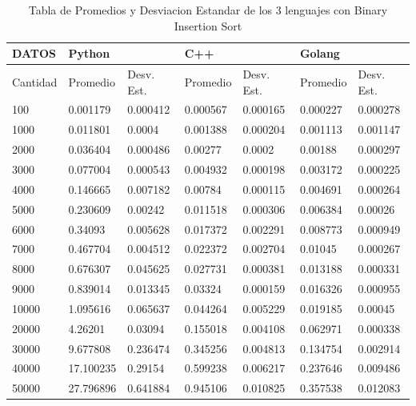 \documentclass[12pt]{article} %
\begin{document}
\begin{table}[H]
    \def\arraystretch{1.3}
    \centering
    \begin{tabular}{|l|l|l|l|l|l|l|}
    \hline        
        DATOS & Python & ~ & C++ & ~ & Golang & ~ \\ \hline
        Cantidad & Promedio & Desv. Est. & Promedio & Desv. Est. & Promedio & Desv. Est. \\ \hline
        100 & 0.001179 & 0.000412 & 0.000567 & 0.000165 & 0.000227 & 0.000278 \\ \hline
        1000 & 0.011801 & 0.0004 & 0.001388 & 0.000204 & 0.001113 & 0.001147 \\ \hline
        2000 & 0.036404 & 0.000486 & 0.00277 & 0.0002 & 0.00188 & 0.000297 \\ \hline
        3000 & 0.077004 & 0.000543 & 0.004932 & 0.000198 & 0.003172 & 0.000225 \\ \hline
        4000 & 0.146665 & 0.007182 & 0.00784 & 0.000115 & 0.004691 & 0.000264 \\ \hline
        5000 & 0.230609 & 0.00242 & 0.011518 & 0.000306 & 0.006384 & 0.00026 \\ \hline
        6000 & 0.34093 & 0.005628 & 0.017372 & 0.002291 & 0.008773 & 0.000949 \\ \hline
        7000 & 0.467704 & 0.004512 & 0.022372 & 0.002704 & 0.01045 & 0.000267 \\ \hline
        8000 & 0.676307 & 0.045625 & 0.027731 & 0.000381 & 0.013188 & 0.000331 \\ \hline
        9000 & 0.839014 & 0.013345 & 0.03324 & 0.000159 & 0.016326 & 0.000955 \\ \hline
        10000 & 1.095616 & 0.065637 & 0.044264 & 0.005229 & 0.019185 & 0.00045 \\ \hline
        20000 & 4.26201 & 0.03094 & 0.155018 & 0.004108 & 0.062971 & 0.000338 \\ \hline
        30000 & 9.677808 & 0.236474 & 0.345256 & 0.004813 & 0.134754 & 0.002914 \\ \hline
        40000 & 17.100235 & 0.29154 & 0.599238 & 0.006217 & 0.237646 & 0.009486 \\ \hline
        50000 & 27.796896 & 0.641884 & 0.945106 & 0.010825 & 0.357538 & 0.012083 \\ \hline
    \end{tabular}
    \caption{Tabla de Promedios y Desviacion Estandar de los 3 lenguajes con Binary Insertion Sort}
\end{table}
\end{document}
